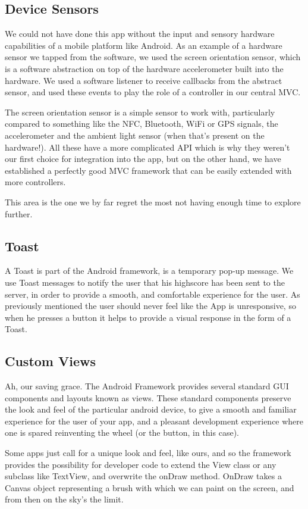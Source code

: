 \documentclass[a4paper, 12pt]{article}
\begin{document}
\subsection{Device Sensors}
We could not have done this app without the input and sensory hardware
capabilities of a mobile platform like Android. As an example of a
hardware sensor we tapped from the software, we used the screen
orientation sensor, which is a software abstraction on top of the
hardware accelerometer built into the hardware. We used a software
listener to receive callbacks from the abstract sensor, and used these
events to play the role of a controller in our central MVC.

The screen orientation sensor is a simple sensor to work with,
particularly compared to something like the NFC, Bluetooth, WiFi or
GPS signals, the accelerometer and the ambient light sensor (when
that's present on the hardware!). All these have a more complicated
API which is why they weren't our first choice for integration into
the app, but on the other hand, we have established a perfectly good
MVC framework that can be easily extended with more controllers.

This area is the one we by far regret the most not having enough time
to explore further.

\subsection{Toast}
A Toast is part of the Android framework, is a temporary pop-up
message. We use Toast messages to notify the user that his highscore
has been sent to the server, in order to provide a smooth, and comfortable experience for the user. As previously mentioned the user should never feel like the App is unresponsive, so when he presses a button it helps to provide a visual response in the form of a Toast.

\subsection{Custom Views}
Ah, our saving grace. The Android Framework provides several standard
GUI components and layouts known as views. These standard components
preserve the look and feel of the particular android device, to give a
smooth and familiar experience for the user of your app, and a
pleasant development experience where one is spared reinventing the
wheel (or the button, in this case).

Some apps just call for a unique look and feel, like ours, and so the
framework provides the possibility for developer code to extend the
View class or any subclass like TextView, and overwrite the onDraw
method. OnDraw takes a Canvas object representing a brush with which
we can paint on the screen, and from then on the sky's the limit.
\end{document}
